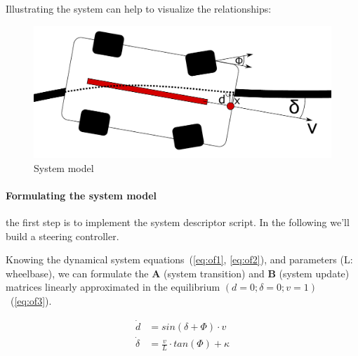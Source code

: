 Illustrating the system can help to visualize the relationships:

\begin{figure}[!ht]
    \centering
    \includegraphics[width=\linewidth]{img/cartop}
    \caption{System model}
    \label{fig:cartop}
\end{figure}

\paragraph{Formulating the system model}

the first step is to implement the system descriptor script. In the following we'll build a steering controller.

Knowing the dynamical system equations~(\ref{eq:of1}, \ref{eq:of2}), and parameters (L: wheelbase), we can formulate the \textbf{A} (system transition) and \textbf{B} (system update) matrices linearly approximated in the equilibrium $(d = 0; \delta = 0; v = 1)$ ~(\ref{eq:of3}).

\begin{align} 
    \dot{d} &= sin(\delta + \Phi) \cdot v  \label{eq:of1} \\ 
    \dot{\delta} &= \frac{v}{L} \cdot tan(\Phi) + \kappa \label{eq:of2}
\end{align}

